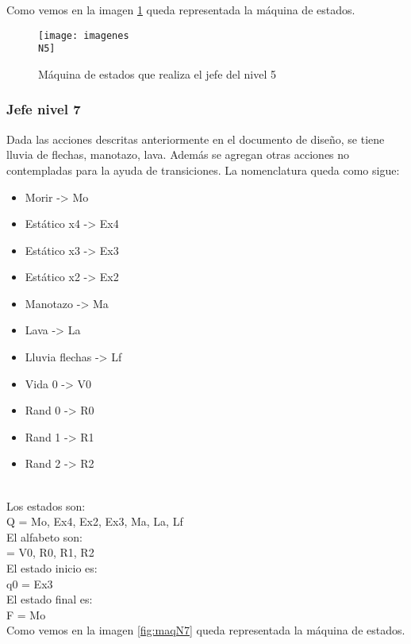 Como vemos en la imagen \ref{fig:maqN5} queda representada la máquina de estados.

\begin{figure}
	\centering
	\caption{Máquina de estados que realiza el jefe del nivel 5}
	\label{fig:maqN5}
	\texttt{[image: imagenes\\N5]}
\end{figure}

\subsubsection{Jefe nivel 7}
Dada las acciones descritas anteriormente en el documento de diseño, se tiene lluvia de flechas, manotazo, lava. Además se agregan otras acciones no contempladas para la ayuda de transiciones.
La nomenclatura queda como sigue:
\\[1pt]

\begin{itemize}
	\item Morir -> Mo
	\item Estático x4 -> Ex4
	\item Estático x3 -> Ex3
	\item Estático x2 -> Ex2
	\item Manotazo -> Ma
	\item Lava -> La
	\item Lluvia flechas -> Lf
	\item Vida 0 -> V0
	\item Rand 0 -> R0
	\item Rand 1 -> R1
	\item Rand 2 -> R2
\end{itemize}
\\[1pt]

Los estados son:
\\[1pt]
Q = {Mo, Ex4, Ex2, Ex3, Ma, La, Lf}
\\[1pt]

El alfabeto son:
\\[1pt]
\sigma = {V0, R0, R1, R2}
\\[1pt]

El estado inicio es:
\\[1pt]
q0 = {Ex3}
\\[1pt]

El estado final es:
\\[1pt]
F = {Mo}
\\[1pt]


Como vemos en la imagen \ref{fig:maqN7} queda representada la máquina de estados.

